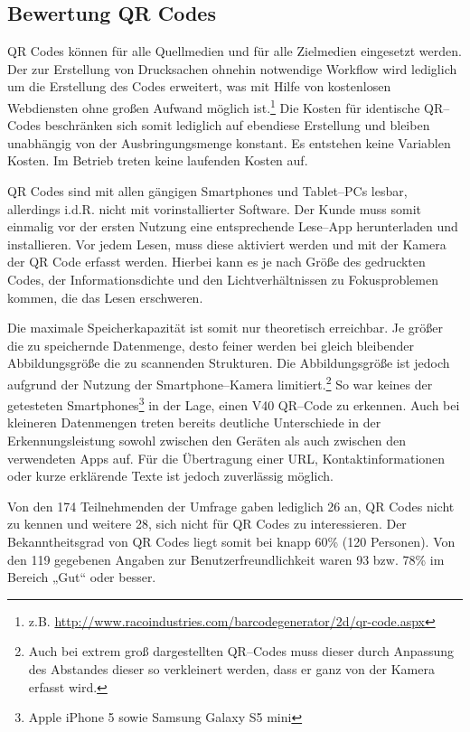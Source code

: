 \subsection{Bewertung QR Codes} %
\label{sub:bewertung_qr_codes}
QR Codes können für alle Quellmedien und für alle Zielmedien eingesetzt werden. Der zur Erstellung von Drucksachen ohnehin notwendige Workflow wird lediglich um die Erstellung des Codes erweitert, was mit Hilfe von kostenlosen Webdiensten ohne großen Aufwand möglich ist.\footnote{z.B. \url{http://www.racoindustries.com/barcodegenerator/2d/qr-code.aspx}} Die Kosten für identische QR–Codes beschränken sich somit lediglich auf ebendiese Erstellung und bleiben unabhängig von der Ausbringungsmenge konstant. Es entstehen keine Variablen Kosten. Im Betrieb treten keine laufenden Kosten auf.

QR Codes sind mit allen gängigen Smartphones und Tablet–PCs lesbar, allerdings i.d.R. nicht mit vorinstallierter Software. Der Kunde muss somit einmalig vor der ersten Nutzung eine entsprechende Lese–App herunterladen und installieren. Vor jedem Lesen, muss diese aktiviert werden und mit der Kamera der QR Code erfasst werden. Hierbei kann es je nach Größe des gedruckten Codes, der Informationsdichte und den Lichtverhältnissen zu Fokusproblemen kommen, die das Lesen erschweren.   

Die maximale Speicherkapazität ist somit nur theoretisch erreichbar. Je größer die zu speichernde Datenmenge, desto feiner werden bei gleich bleibender Abbildungsgröße die zu scannenden Strukturen. Die Abbildungsgröße ist jedoch aufgrund der Nutzung der Smartphone–Kamera limitiert.\footnote{Auch bei extrem groß dargestellten QR–Codes muss dieser durch Anpassung des Abstandes dieser so verkleinert werden, dass er ganz von der Kamera erfasst wird.} So war keines der getesteten Smartphones\footnote{Apple iPhone 5 sowie Samsung Galaxy S5 mini} in der Lage, einen V40 QR–Code zu erkennen. Auch bei kleineren Datenmengen treten bereits deutliche Unterschiede in der Erkennungsleistung sowohl zwischen den Geräten als auch zwischen den verwendeten Apps auf. Für die Übertragung einer \ac{URL}, Kontaktinformationen oder kurze erklärende Texte ist jedoch zuverlässig möglich.

Von den 174 Teilnehmenden der Umfrage gaben lediglich 26 an, QR Codes nicht zu kennen und weitere 28, sich nicht für QR Codes zu interessieren. Der Bekanntheitsgrad von QR Codes liegt somit bei knapp 60\% (120 Personen). Von den 119 gegebenen Angaben zur Benutzerfreundlichkeit waren 93 bzw. 78\% im Bereich „Gut“ oder besser.

